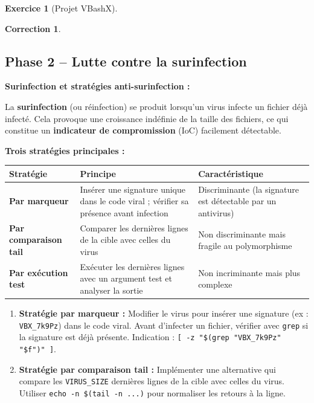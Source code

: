 \documentclass[a4paper,11pt]{article}
\theoremstyle{plain}
\newtheorem{correction}{Correction}
\theoremstyle{definition}
\newtheorem{exercice}{Exercice}
\begin{document}
\begin{exercice}[Projet VBashX]
\begin{correction}
\end{correction}



\subsection*{Phase 2 -- Lutte contre la surinfection}

\begin{rappel}
\textbf{Surinfection et stratégies anti-surinfection :}

La \textbf{surinfection} (ou réinfection) se produit lorsqu'un virus infecte un fichier déjà infecté. Cela provoque une croissance indéfinie de la taille des fichiers, ce qui constitue un \textbf{indicateur de compromission} (IoC) facilement détectable.

\medskip
\textbf{Trois stratégies principales :}

\begin{center}
\begin{tabular}{lp{5cm}p{4cm}}
\toprule
\textbf{Stratégie} & \textbf{Principe} & \textbf{Caractéristique} \\
\midrule
\textbf{Par marqueur} & Insérer une signature unique dans le code viral ; vérifier sa présence avant infection & Discriminante (la signature est détectable par un antivirus) \\
\textbf{Par comparaison tail} & Comparer les dernières lignes de la cible avec celles du virus & Non discriminante mais fragile au polymorphisme \\
\textbf{Par exécution test} & Exécuter les dernières lignes avec un argument test et analyser la sortie & Non incriminante mais plus complexe \\
\bottomrule
\end{tabular}
\end{center}
\end{rappel}

\begin{enumerate}
\item[\textbf{2a)}] \textbf{Stratégie par marqueur :} Modifier le virus pour insérer une signature (ex : \texttt{VBX\_7k9Pz}) dans le code viral. Avant d'infecter un fichier, vérifier avec \texttt{grep} si la signature est déjà présente. Indication : \texttt{[ -z "\$(grep "VBX\_7k9Pz" "\$f")" ]}.

\item[\textbf{2b)}] \textbf{Stratégie par comparaison tail :} Implémenter une alternative qui compare les \texttt{VIRUS\_SIZE} dernières lignes de la cible avec celles du virus. Utiliser \texttt{echo -n \$(tail -n ...)} pour normaliser les retours à la ligne.


\end{enumerate}
\end{exercice}
\end{document}
